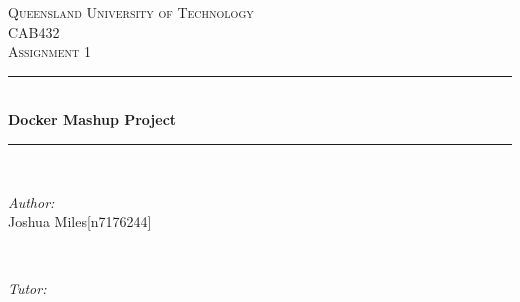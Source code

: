 \documentclass[12pt]{article}
\begin{document}
\begin{titlepage}

\newcommand{\HRule}{\rule{\linewidth}{0.5mm}} %

\center %
 

\textsc{\LARGE Queensland University of Technology}\\[1.5cm] %
\textsc{\Large CAB432}\\[0.5cm] %
\textsc{\large Assignment 1}\\[0.5cm] %


\HRule \\[0.4cm]
{ \huge \bfseries Docker Mashup Project }\\[0.4cm] %
\HRule \\[1.5cm]
 

\begin{minipage}{0.4\textwidth}
\begin{flushleft} \large
\emph{Author:}\\
Joshua Miles[n7176244] %
\end{flushleft}
\end{minipage}
~
\begin{minipage}{0.4\textwidth}
\begin{flushright} \large
\emph{Tutor:} \\
 \textsc{} %
\end{flushright}
\end{minipage}\\[0.5cm]



\end{titlepage}
\end{document}
